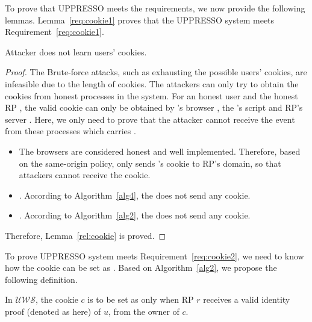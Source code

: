 To prove that UPPRESSO meets the requirements, we now provide the following lemmas. Lemma~\ref{req:cookie1} proves that the UPPRESSO system meets Requirement~\ref{req:cookie1}.
\begin{relemma}
Attacker does not learn users' cookies.
\label{rel:cookie}
\end{relemma}

\begin{proof}
The Brute-force attacks, such as exhausting the possible users' cookies, are infeasible due to the length of cookies. The attackers can only try to obtain the cookies from honest processes in the system.  For an honest user  and the honest RP , the valid cookie  can only be obtained by 's browser , the 's script  and RP's server  .
Here, we only need to prove that the attacker cannot receive the event from these processes which carries .
\begin{itemize}
\setlength\itemsep{-2pt}
\item {} The browsers are considered honest and well implemented. Therefore, based on the same-origin policy,  only sends 's cookie to RP's domain, so that attackers cannot receive the cookie.
\item {}. According to Algorithm~\ref{alg4}, the  does not send any cookie.
\item {}. According to Algorithm~\ref{alg2}, the  does not send any cookie.
\end{itemize}
Therefore, Lemma~\ref{rel:cookie} is proved.
\end{proof}

To prove UPPRESSO system meets Requirement~\ref{req:cookie2}, we need to know how the cookie can be set as . Based on Algorithm~\ref{alg2}, we propose the following definition.
\begin{redef}
In $\mathcal{UWS}$, the cookie $c$ is to be set as  only when RP $r$ receives a valid  identity proof (denoted as  here) of $u$, from the owner of $c$.
\label{red:token}
\end{redef}

